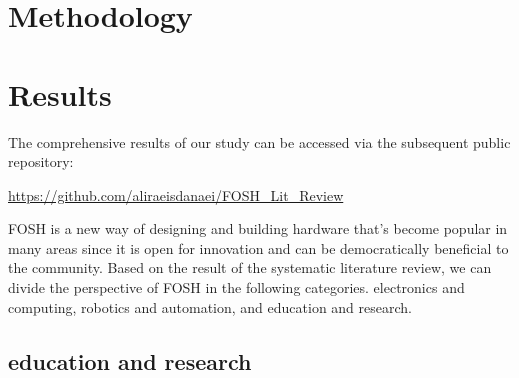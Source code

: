 \documentclass[acmtog]{acmart}
\begin{document}

\section{Methodology}
\label{methodology}



\section{Results}
The comprehensive results of our study can be accessed via the subsequent public repository:
\par
\url{https://github.com/aliraeisdanaei/FOSH_Lit_Review}

FOSH is a new way of designing and building hardware that's become popular in many areas since it is open for innovation and can be democratically beneficial to the community. Based on the result of the systematic literature review, we can divide the perspective of FOSH in the following categories. electronics and computing, robotics and automation, and education and research.
\subsection{education and research}



\end{document}
